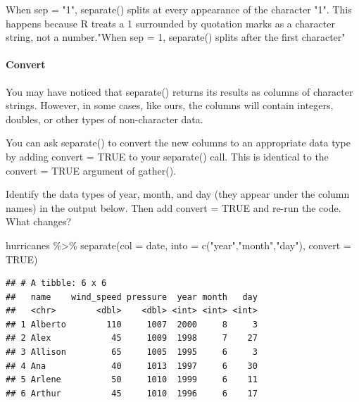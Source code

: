 \documentclass[
]{article}
\newenvironment{Shaded}{\begin{snugshade}}{\end{snugshade}}
\newcommand{\AttributeTok}[1]{\textcolor[rgb]{0.77,0.63,0.00}{#1}}
\newcommand{\ConstantTok}[1]{\textcolor[rgb]{0.00,0.00,0.00}{#1}}
\newcommand{\FunctionTok}[1]{\textcolor[rgb]{0.00,0.00,0.00}{#1}}
\newcommand{\NormalTok}[1]{#1}
\newcommand{\SpecialCharTok}[1]{\textcolor[rgb]{0.00,0.00,0.00}{#1}}
\newcommand{\StringTok}[1]{\textcolor[rgb]{0.31,0.60,0.02}{#1}}
\begin{document}
\begin{Shaded}
\begin{Highlighting}[]
\NormalTok{When sep = "1", separate() splits at every appearance of the character "1". This happens because R treats a 1 surrounded by quotation marks as a character string, not a number.\textquotesingle{}"When sep = 1, separate() splits after the first character"}
\end{Highlighting}
\end{Shaded}

\hypertarget{convert}{%
\paragraph{Convert}\label{convert}}

You may have noticed that separate() returns its results as columns of
character strings. However, in some cases, like ours, the columns will
contain integers, doubles, or other types of non-character data.

You can ask separate() to convert the new columns to an appropriate data
type by adding convert = TRUE to your separate() call. This is identical
to the convert = TRUE argument of gather().

Identify the data types of year, month, and day (they appear under the
column names) in the output below. Then add convert = TRUE and re-run
the code. What changes?

\begin{Shaded}
\begin{Highlighting}[]
\NormalTok{hurricanes }\SpecialCharTok{\%\textgreater{}\%} 
  \FunctionTok{separate}\NormalTok{(}\AttributeTok{col =}\NormalTok{ date, }\AttributeTok{into =} \FunctionTok{c}\NormalTok{(}\StringTok{"year"}\NormalTok{,}\StringTok{"month"}\NormalTok{,}\StringTok{"day"}\NormalTok{), }\AttributeTok{convert =} \ConstantTok{TRUE}\NormalTok{)}
\end{Highlighting}
\end{Shaded}

\begin{verbatim}
## # A tibble: 6 x 6
##   name    wind_speed pressure  year month   day
##   <chr>        <dbl>    <dbl> <int> <int> <int>
## 1 Alberto        110     1007  2000     8     3
## 2 Alex            45     1009  1998     7    27
## 3 Allison         65     1005  1995     6     3
## 4 Ana             40     1013  1997     6    30
## 5 Arlene          50     1010  1999     6    11
## 6 Arthur          45     1010  1996     6    17
\end{verbatim}
\end{document}
